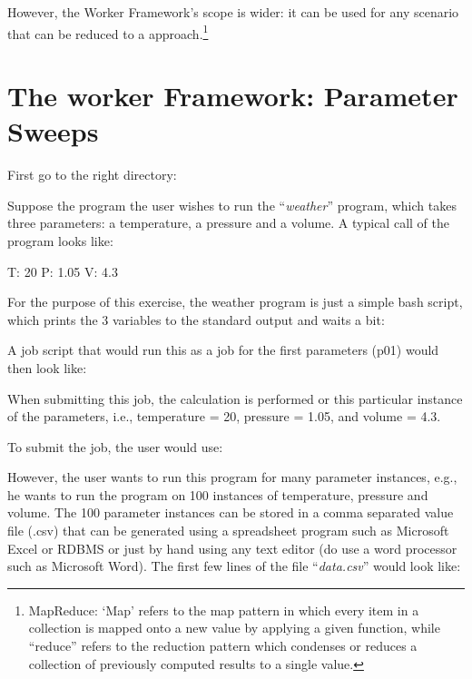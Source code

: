 However, the Worker Framework's scope is wider: it can be used for any scenario
that can be reduced to a  approach.\footnote{MapReduce:
`Map' refers to the map pattern in which every item in a collection is mapped
onto a new value by applying a given function, while ``reduce'' refers to the
reduction pattern which condenses or reduces a collection of previously
computed results to a single value.}

\section{The worker Framework: Parameter Sweeps}

First go to the right directory:

\begin{prompt}
\end{prompt}

Suppose the program the user wishes to run the ``\emph{weather}'' program,
which takes three parameters: a temperature, a pressure and a volume. A typical
call of the program looks like:

\begin{prompt}
T: 20  P: 1.05  V: 4.3
\end{prompt}

For the purpose of this exercise, the weather program is just a simple bash
script, which prints the 3 variables to the standard output and waits a bit:


A job script that would run this as a job for the first parameters (p01) would
then look like:


When submitting this job, the calculation is performed or this particular
instance of the parameters, i.e., temperature = 20, pressure = 1.05, and volume
= 4.3.

To submit the job, the user would use:

\begin{prompt}
\end{prompt}

However, the user wants to run this program for many parameter instances, e.g.,
he wants to run the program on 100 instances of temperature, pressure and
volume.  The 100 parameter instances can be stored in a comma separated value
file (.csv) that can be generated using a spreadsheet program such as Microsoft
Excel or RDBMS or just by hand using any text editor (do  use a
word processor such as Microsoft Word). The first few lines of the file
``\emph{data.csv}'' would look like:

